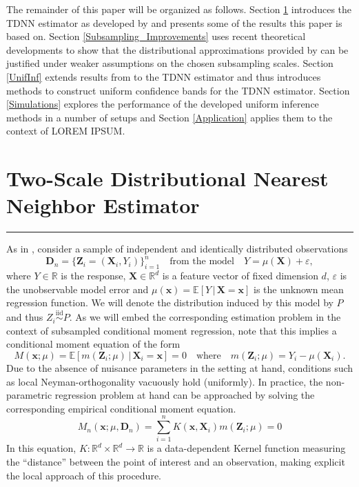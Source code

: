 \documentclass[letterpaper,10pt]{article}
\numberwithin{equation}{section}
\numberwithin{theorem}{section}
\theoremstyle{definition}
\newcommand{\1}{\mathbb{1}}
\begin{document}
The remainder of this paper will be organized as follows.
Section \ref{TDNN} introduces the TDNN estimator as developed by \citet{demirkaya_optimal_2024} and presents some of the results this paper is based on.
Section \ref{Subsampling_Improvements} uses recent theoretical developments to show that the distributional approximations provided by \citet{demirkaya_optimal_2024} can be justified under weaker assumptions on the chosen subsampling scales.
Section \ref{UnifInf} extends results from \citet{ritzwoller_uniform_2024} to the TDNN estimator and thus introduces methods to construct uniform confidence bands for the TDNN estimator.
Section \ref{Simulations} explores the performance of the developed uniform inference methods in a number of setups and Section \ref{Application} applies them to the context of {\color{red} LOREM IPSUM}.

\newpage
\section{Two-Scale Distributional Nearest Neighbor Estimator}\label{TDNN}
\hrule
As in \citet{demirkaya_optimal_2024}, consider a sample of independent and identically distributed observations
\begin{equation}\label{DGP}
	\mathbf{D}_n = \{\mathbf{Z}_i = (\mathbf{X}_i, Y_i)\}_{i = 1}^{n}
	\quad \text{from the model} \quad
	Y = \mu(\mathbf{X}) + \varepsilon,
\end{equation}
where $Y \in \mathbb{R}$ is the response, $\mathbf{X} \in \mathbb{R}^d$ is a feature vector of fixed dimension $d$, $\varepsilon$ is the unobservable model error and $\mu(\mathbf{x}) = \mathbb{E}\left[Y \, | \, \mathbf{X} = \mathbf{x}\right]$ is the unknown mean regression function.
We will denote the distribution induced by this model by $P$ and thus $Z_i \overset{\text{iid}}{\sim} P$.
As we will embed the corresponding estimation problem in the context of subsampled conditional moment regression, note that this implies a conditional moment equation of the form
\begin{equation}\label{CondMomEq}
	M(\mathbf{x}; \mu)
	= \mathbb{E}\left[m(\mathbf{Z}_i; \mu) \, | \, \mathbf{X}_i = \mathbf{x}\right]
	= 0
	\quad \text{where} \quad
	m(\mathbf{Z}_i; \mu) = Y_i - \mu(\mathbf{X}_i).
\end{equation}
Due to the absence of nuisance parameters in the setting at hand, conditions such as local Neyman-orthogonality vacuously hold (uniformly).
In practice, the non-parametric regression problem at hand can be approached by solving the corresponding empirical conditional moment equation.
\begin{equation}\label{EmpCondMomEq}
	M_n(\mathbf{x}; \mu, \mathbf{D}_n)
	= \sum_{i = 1}^{n}K(\mathbf{x}, \mathbf{X}_i)m(\mathbf{Z}_i; \mu)
	= 0
\end{equation}
In this equation, $K:\mathbb{R}^d \times \mathbb{R}^d \rightarrow \mathbb{R}$ is a data-dependent Kernel function measuring the ``distance'' between the point of interest and an observation, making explicit the local approach of this procedure.
\end{document}
